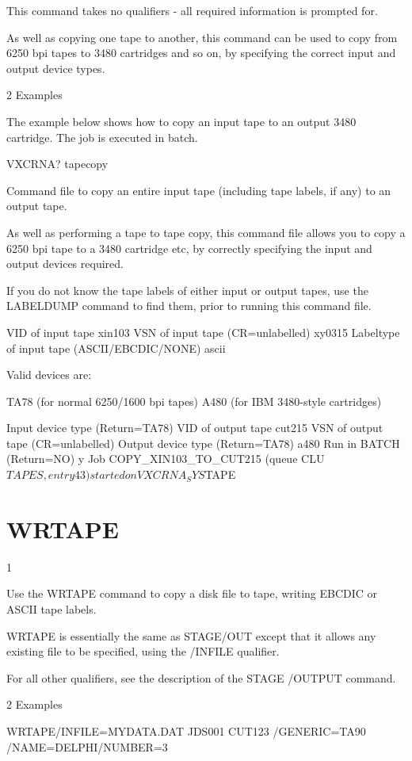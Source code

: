 \begin{XMP}
This command takes no qualifiers - all required information
is prompted for.

As well as copying one tape to another, this command can be
used to copy from 6250 bpi tapes to 3480 cartridges and so
on, by specifying the correct input and output device types.

2 Examples

The example below shows how to copy an input tape to an output 3480
cartridge. The job is executed in batch.


VXCRNA? tapecopy

Command file to copy an entire input tape (including tape labels, if any)
to an output tape.

As well as performing a tape to tape copy,  this command file allows you
to copy a 6250 bpi tape to a 3480 cartridge etc, by correctly specifying
the input and output devices required.

If you do not know the tape labels of either input or output tapes, use the
LABELDUMP command to find them, prior to running this command file.

VID of input tape       xin103
VSN of input tape       (CR=unlabelled) xy0315
Labeltype of input tape       (ASCII/EBCDIC/NONE) ascii

Valid devices are:

TA78 (for normal 6250/1600 bpi tapes)
A480 (for IBM 3480-style cartridges)

Input device type       (Return=TA78)
VID of output tape       cut215
VSN of output tape       (CR=unlabelled)
Output device type       (Return=TA78) a480
Run in BATCH       (Return=NO) y
Job COPY_XIN103_TO_CUT215 (queue CLU$TAPES, entry 43) started on VXCRNA_SYS$TAPE

\section{WRTAPE}
1 

  Use the WRTAPE command to copy a disk file to tape, writing EBCDIC
  or ASCII tape labels.

  WRTAPE is essentially the same as STAGE/OUT except that it allows any
  existing file to be specified, using the /INFILE qualifier.

  For all other qualifiers, see the description of the STAGE /OUTPUT command.

2 Examples

WRTAPE/INFILE=MYDATA.DAT JDS001 CUT123 /GENERIC=TA90 /NAME=DELPHI/NUMBER=3


\end{XMP}
